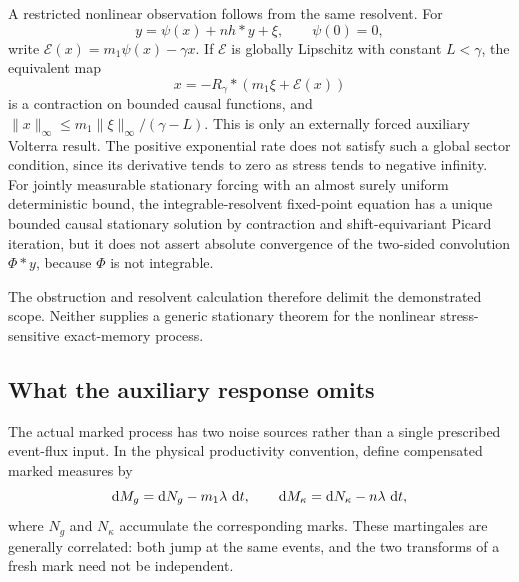 A restricted nonlinear observation follows from the same resolvent. For
\[
y=\psi(x)+nh*y+\xi,\qquad \psi(0)=0,
\]
write \(\mathcal E(x)=m_1\psi(x)-\gamma x\). If \(\mathcal E\) is globally Lipschitz with constant \(L<\gamma\), the equivalent map
\[
x=-R_\gamma*(m_1\xi+\mathcal E(x))
\]
is a contraction on bounded causal functions, and
\(\|x\|_\infty\leq m_1\|\xi\|_\infty/(\gamma-L)\). This is only an externally forced auxiliary Volterra result. The positive exponential rate does not satisfy such a global sector condition, since its derivative tends to zero as stress tends to negative infinity. For jointly measurable stationary forcing with an almost surely uniform deterministic bound, the integrable-resolvent fixed-point equation has a unique bounded causal stationary solution by contraction and shift-equivariant Picard iteration, but it does not assert absolute convergence of the two-sided convolution \(\Phi*y\), because \(\Phi\) is not integrable.

The obstruction and resolvent calculation therefore delimit the demonstrated scope. Neither supplies a generic stationary theorem for the nonlinear stress-sensitive exact-memory process.

\subsection{What the auxiliary response omits}

The actual marked process has two noise sources rather than a single prescribed event-flux input. In the physical productivity convention, define compensated marked measures by
\[
\mathop{}\!\mathrm{d} M_g=\mathop{}\!\mathrm{d} N_g-m_1\lambda\,\mathop{}\!\mathrm{d} t,\qquad
\mathop{}\!\mathrm{d} M_\kappa=\mathop{}\!\mathrm{d} N_\kappa-n\lambda\,\mathop{}\!\mathrm{d} t,
\]
where $N_g$ and $N_\kappa$ accumulate the corresponding marks. These martingales are generally correlated: both jump at the same events, and the two transforms of a fresh mark need not be independent. 

